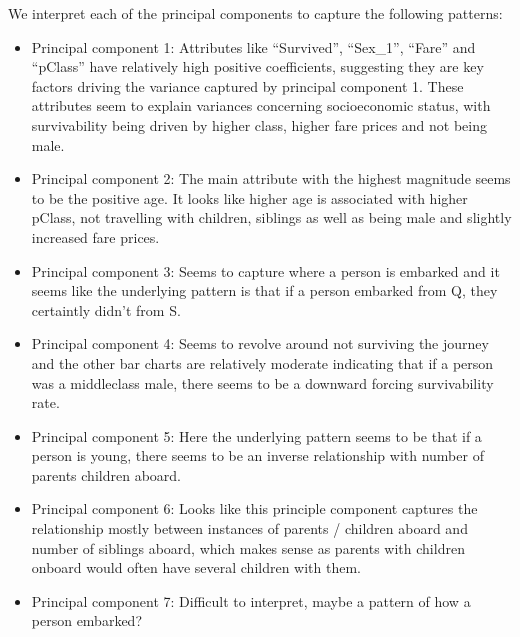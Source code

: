 \documentclass[twoside,11pt]{article}
\begin{document}
We interpret each of the principal components to capture the following patterns:

\begin{itemize}
	\item Principal component 1: Attributes like ``Survived'', ``Sex\_1'', ``Fare'' and ``pClass'' have relatively high positive coefficients, suggesting they are key factors driving the variance captured by principal component 1. These attributes seem to explain variances concerning socioeconomic status, with survivability being driven by higher class, higher fare prices and not being male.

	\item Principal component 2: The main attribute with the highest magnitude seems to be the positive age. It looks like higher age is associated with higher pClass, not travelling with children, siblings as well as being male and slightly increased fare prices.

	\item Principal component 3: Seems to capture where a person is embarked and it seems like the underlying pattern is that if a person embarked from Q, they certaintly didn't from S.

	\item Principal component 4: Seems to revolve around not surviving the journey and the other bar charts are relatively moderate indicating that if a person was a middleclass male, there seems to be a downward forcing survivability rate.

	\item Principal component 5: Here the underlying pattern seems to be that if a person is young, there seems to be an inverse relationship with number of parents children aboard.

	\item Principal component 6: Looks like this principle component captures the relationship mostly between instances of parents / children aboard and number of siblings aboard, which makes sense as parents with children onboard would often have several children with them.

	\item Principal component 7: Difficult to interpret, maybe a pattern of how a person embarked?
\end{itemize}
\end{document}
